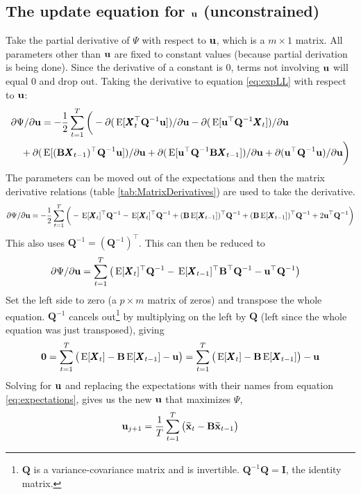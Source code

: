 \documentclass[]{article}
\def\BB{\mbox{$\mathbf B$}}	\def\bb{\mbox{$\mathbf b$}}
\def\II{\mbox{$\mathbf I$}} \def\ii{\mbox{$\mathbf i$}}
\def\QQ{\mbox{$\mathbf Q$}}	 \def\qq{\mbox{$\mathbf q$}}
\def\XX{\mbox{$\pmb{X}$}}	\def\xx{\mbox{$\pmb{x}$}}
\def\E{\,\textup{\textrm{E}}}
\def\hatxt{\widetilde{\mbox{$\mathbf x$}}_t}
\def\hatxtm{\widetilde{\mbox{$\mathbf x$}}_{t-1}}
\begin{document}
\subsection{The update equation for $\mbox{$\mathbf u$}$ (unconstrained)}
Take the partial derivative of $\Psi$ with respect to $\mbox{$\mathbf u$}$, which is a $m \times 1$ matrix. All parameters other than $\mbox{$\mathbf u$}$ are fixed to constant values (because partial derivation is being done).  Since the derivative of a constant is 0, terms not involving $\mbox{$\mathbf u$}$ will equal 0 and drop out.  Taking the derivative to equation \ref{eq:expLL} with respect to $\mbox{$\mathbf u$}$:
\begin{equation}\label{eq:u.unconstrained1}
\begin{split}
&\partial\Psi/\partial\uu = - \frac{1}{2}\sum_{t=1}^T \bigg(-  \partial(\E[\XX_t^\top\QQ^{-1}\uu])/\partial\uu
- \partial(\E[\uu^\top\QQ^{-1}\XX_t])/\partial\uu \\
&\quad + \partial(\E[(\BB\XX_{t-1})^\top\QQ^{-1}\uu])/\partial\uu 
+ \partial(\E[\uu^\top\QQ^{-1}\BB\XX_{t-1}])/\partial\uu + \partial(\uu^\top\QQ^{-1}\uu)/\partial\uu \bigg)
\end{split}
\end{equation}
The parameters can be moved out of the expectations and then the matrix derivative relations (table \ref{tab:MatrixDerivatives}) are used to take the derivative. 
\begin{equation}\label{eq:u.unconstrained2}
\begin{split}
\partial\Psi/\partial\uu = - \frac{1}{2}\sum_{t=1}^T\bigg(- \E[\XX_t]^\top\QQ^{-1} 
- \E[\XX_t]^\top\QQ^{-1} + (\BB\E[\XX_{t-1}])^\top\QQ^{-1} + (\BB\E[\XX_{t-1}])^\top\QQ^{-1} + 2\uu^\top\QQ^{-1} \bigg)
\end{split}
\end{equation}
This also uses $\QQ^{-1} = (\QQ^{-1})^\top$. This can then be reduced to 
\begin{equation}\label{eq:u.unconstrained3}
\begin{split}
&\partial\Psi/\partial\uu = \sum_{t=1}^T\big(\E[\XX_t]^\top\QQ^{-1} 
 - \E[\XX_{t-1}]^\top\BB^\top\QQ^{-1} -  \uu^\top\QQ^{-1} \big)
\end{split}
\end{equation}
Set the left side to zero (a $p \times m$ matrix of zeros) and transpose the whole equation. $\QQ^{-1}$ cancels out\footnote{$\QQ$ is a variance-covariance matrix and is invertible. $\QQ^{-1}\QQ=\II$, the identity matrix.} by multiplying on the left by $\QQ$ (left since the whole equation was just transposed), giving
\begin{equation}\label{eq:u.unconstrained4}
\mathbf{0} = \sum_{t=1}^T\big(\E[\XX_t] - \BB\E[\XX_{t-1}] - \uu \big)
= \sum_{t=1}^T\big(\E[\XX_t] - \BB\E[\XX_{t-1}] \big) - \uu
\end{equation}
Solving for $\mbox{$\mathbf u$}$ and replacing the expectations with their names from equation \ref{eq:expectations}, gives us the new $\mbox{$\mathbf u$}$ that maximizes $\Psi$, 
\begin{equation}\label{eq:uupdate.unconstrained}
\uu_{j+1} =  \frac{1}{T} \sum_{t=1}^T\big(\hatxt - \BB\hatxtm \big)
\end{equation}
\end{document}

